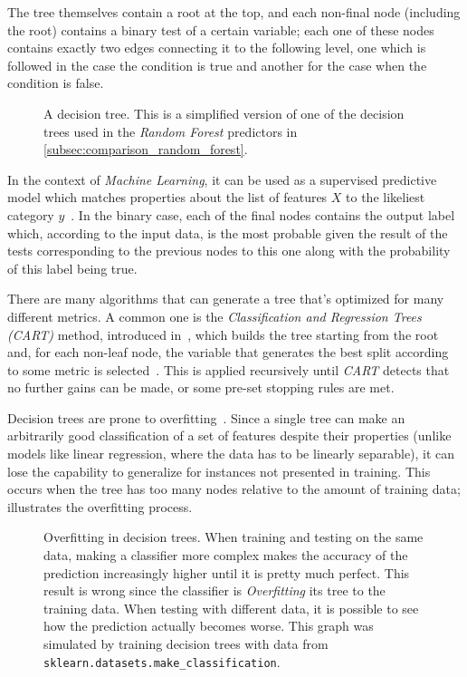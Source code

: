 The tree themselves contain a root at the top, and each non-final node (including the root) contains a binary test of a certain variable; each one of these nodes contains exactly two edges connecting it to the following level, one which is followed in the case the condition is true and another for the case when the condition is false.

\begin{figure}
\centering
{}
\caption{A decision tree. This is a simplified version of one of the decision trees used in the \emph{Random Forest} predictors in \cref{subsec:comparison_random_forest}.}
\label{fig:decision_tree}
\end{figure}

In the context of \emph{Machine Learning}, it can be used as a supervised predictive model which matches properties about the list of features $X$ to the likeliest category $y$~\cite{oded2008decisiontrees}. In the binary case, each of the final nodes contains the output label which, according to the input data, is the most probable given the result of the tests corresponding to the previous nodes to this one along with the probability of this label being true.

There are many algorithms that can generate a tree that's optimized for many different metrics. A common one is the \emph{Classification and Regression Trees (CART)} method, introduced in~\cite{breiman1993classification}, which builds the tree starting from the root and, for each non-leaf node, the variable that generates the best split according to some metric is selected~\cite{loh2011classification}. This is applied recursively until \emph{CART} detects that no further gains can be made, or some pre-set stopping rules are met.

Decision trees are prone to overfitting~\cite{oded2008decisiontrees}. Since a single tree can make an arbitrarily good classification of a set of features despite their properties (unlike models like linear regression, where the data has to be linearly separable), it can lose the capability to generalize for instances not presented in training. This occurs when the tree has too many nodes relative to the amount of training data;  illustrates the overfitting process.

\begin{figure}
\centering
{}
	\caption{Overfitting in decision trees. When training and testing on the same data, making a classifier more complex makes the accuracy of the prediction increasingly higher until it is pretty much perfect. This result is wrong since the classifier is \emph{Overfitting} its tree to the training data. When testing with different data, it is possible to see how the prediction actually becomes worse. This graph was simulated by training decision trees with data from \texttt{sklearn.datasets.make\_classification}\cite{sklearn-make-classification}.}
\label{fig:decisiontreeoverfitting}
\end{figure}

